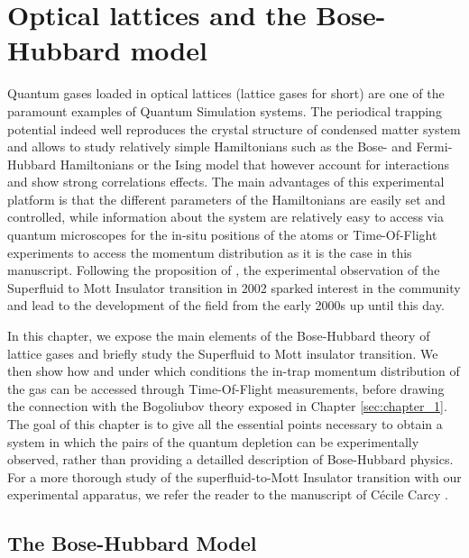
\chapter{Optical lattices and the Bose-Hubbard model}

\label{sec:chapter_2}

Quantum gases loaded in optical lattices (lattice gases for short) are one of the paramount examples of Quantum Simulation systems. The periodical trapping potential indeed well reproduces the crystal structure of condensed matter system and allows to study relatively simple Hamiltonians such as the Bose- and Fermi-Hubbard Hamiltonians or the Ising model \cite{bloch2005ultracold} that however account for interactions and show strong correlations effects. The main advantages of this experimental platform is that the different parameters of the Hamiltonians are easily set and controlled, while information about the system are relatively easy to access via quantum microscopes \cite{bakr2009quantum} for the in-situ positions of the atoms or Time-Of-Flight experiments to access the momentum distribution as it is the case in this manuscript. Following the proposition of \cite{jaksch1998cold}, the experimental observation of the Superfluid to Mott Insulator transition in 2002 \cite{greiner2002quantum} sparked interest in the community and lead to the development of the field from the early 2000s up until this day.

In this chapter, we expose the main elements of the Bose-Hubbard theory of lattice gases and briefly study the Superfluid to Mott insulator transition. We then show how and under which conditions the in-trap momentum distribution of the gas can be accessed through Time-Of-Flight measurements, before drawing the connection with the Bogoliubov theory exposed in Chapter \ref{sec:chapter_1}. The goal of this chapter is to give all the essential points necessary to obtain a system in which the \kmk pairs of the quantum depletion can be experimentally observed, rather than providing a detailled description of Bose-Hubbard physics. For a more thorough study of the superfluid-to-Mott Insulator transition with our experimental apparatus, we refer the reader to the manuscript of Cécile Carcy \cite{carcy_these}.




\section{The Bose-Hubbard Model}

